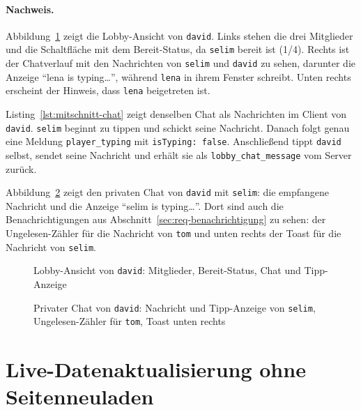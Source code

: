 \paragraph{Nachweis.} Abbildung~\ref{fig:lobby} zeigt die Lobby-Ansicht von \texttt{david}. Links stehen die drei Mitglieder und die Schaltfläche mit dem Bereit-Status, da \texttt{selim} bereit ist (1/4). Rechts ist der Chatverlauf mit den Nachrichten von \texttt{selim} und \texttt{david} zu sehen, darunter die Anzeige \enquote{lena is typing\ldots}, während \texttt{lena} in ihrem Fenster schreibt. Unten rechts erscheint der Hinweis, dass \texttt{lena} beigetreten ist.

Listing~\ref{lst:mitschnitt-chat} zeigt denselben Chat als Nachrichten im Client von \texttt{david}. \texttt{selim} beginnt zu tippen und schickt seine Nachricht. Danach folgt genau eine Meldung \texttt{player\_typing} mit \texttt{isTyping: false}. Anschließend tippt \texttt{david} selbst, sendet seine Nachricht und erhält sie als \texttt{lobby\_chat\_message} vom Server zurück.

Abbildung~\ref{fig:privatchat} zeigt den privaten Chat von \texttt{david} mit \texttt{selim}: die empfangene Nachricht und die Anzeige \enquote{selim is typing\ldots}. Dort sind auch die Benachrichtigungen aus Abschnitt~\ref{sec:req-benachrichtigung} zu sehen: der Ungelesen-Zähler für die Nachricht von \texttt{tom} und unten rechts der Toast für die Nachricht von \texttt{selim}.



\begin{figure}[ht]
  \centering
  \caption{Lobby-Ansicht von \texttt{david}: Mitglieder, Bereit-Status, Chat und Tipp-Anzeige}
  \label{fig:lobby}
\end{figure}

\begin{figure}[ht]
  \centering
  \caption{Privater Chat von \texttt{david}: Nachricht und Tipp-Anzeige von \texttt{selim}, Ungelesen-Zähler für \texttt{tom}, Toast unten rechts}
  \label{fig:privatchat}
\end{figure}

\section{Live-Datenaktualisierung ohne Seitenneuladen}
\label{sec:req-neuladen}

